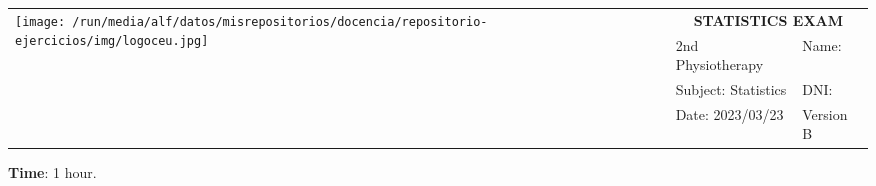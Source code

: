 \documentclass[a4paper]{article}
\begin{document}
\begin{center}
\doublespacing
\sffamily
\begin{tabular}{|p{}|p{}|p{}|}
\hline
\multirow{4}{*}{\texttt{[image: /run/media/alf/datos/misrepositorios/docencia/repositorio-ejercicios/img/logoceu.jpg]}} & \multicolumn{2}{c|}{\LARGE \textbf{STATISTICS EXAM}} \\
\cline{2-3}
& 2nd Physiotherapy & Name: \\
\cline{2-3}
& Subject: Statistics & DNI: \\
\cline{2-3}
& Date: 2023/03/23 & Version B\\
\hline
\end{tabular}
\end{center}

\noindent\textbf{Time}: 1 hour. \vskip 1cm

\begin{enumerate}[leftmargin=*]

\end{enumerate}
\end{document}
